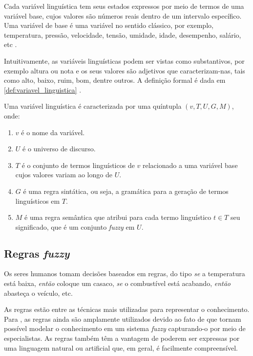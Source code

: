 Cada variável linguística tem seus estados expressos por meio de termos de uma variável base, cujos valores são números reais dentro de um intervalo específico. Uma variável de base é uma variável no sentido clássico, por exemplo, temperatura, pressão, velocidade, tensão, umidade, idade, desempenho, salário, etc \citep{klir:95}.

Intuitivamente, as variáveis linguísticas  podem ser vistas como substantivos, por exemplo altura ou nota e os seus valores são adjetivos que caracterizam-nas, tais como alto, baixo, ruim, bom, dentre outros. A definição formal é dada em \ref{def:variavel_linguistica} \citep{zadeh:75, klir:95}.

\begin{defn}
\label{def:variavel_linguistica}
Uma variável linguística é caracterizada por uma quíntupla $(v, T, U, G, M)$, onde:

\begin{enumerate}[label=(\roman*)]
\item $v$ é o nome da variável.
\item $U$ é o universo de discurso.
\item $T$ é o conjunto de termos linguísticos de $v$ relacionado a uma variável base cujos valores variam ao longo de $U$.
\item $G$ é uma regra sintática, ou seja, a gramática para a geração de termos linguísticos em $T$.
\item $M$ é uma regra semântica que atribui para cada termo linguístico $t \in T$ seu significado, que é um conjunto \emph{fuzzy} em $U$.
\end{enumerate}
\end{defn}


\subsection{Regras \emph{fuzzy}}
\label{sec:regras_fuzzy}
Os seres humanos tomam decisões baseados em regras, do tipo \emph{se} a temperatura está baixa, \emph{então} coloque um casaco, \emph{se} o combustível está acabando, \emph{então} abasteça o veículo, etc.

As regras estão entre as técnicas mais utilizadas para representar o conhecimento. Para \citet{zimmermann:01}, as regras ainda são amplamente utilizados devido ao fato de que tornam possível modelar o conhecimento em um sistema \emph{fuzzy} capturando-o por meio de especialistas. As regras também têm a vantagem de poderem ser expressas por uma linguagem natural ou artificial que, em geral, é facilmente compreensível.

